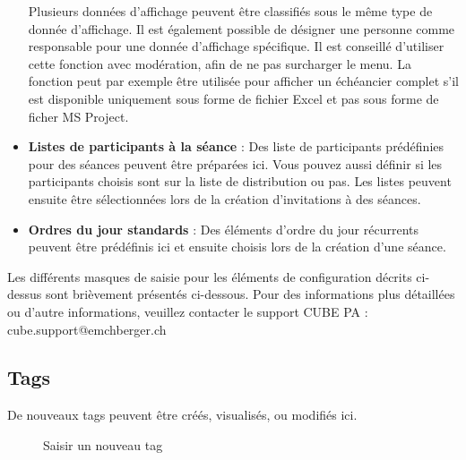\begin{itemize}
Plusieurs données d'affichage peuvent être classifiés sous le même type de donnée d'affichage. Il est également possible de désigner une personne comme responsable pour une donnée d'affichage spécifique. Il est conseillé d'utiliser cette fonction avec modération, afin de ne pas surcharger le menu. La fonction peut par exemple être utilisée pour afficher un échéancier complet s'il est disponible uniquement sous forme de fichier Excel et pas sous forme de ficher MS Project.
\item
\textbf{Listes de participants à la séance} : Des liste de participants prédéfinies pour des séances peuvent être préparées ici. Vous pouvez aussi définir si les participants choisis sont sur la liste de distribution ou pas. Les listes peuvent ensuite être sélectionnées lors de la création d'invitations à des séances.
\item
\textbf{Ordres du jour standards} : Des éléments d'ordre du jour récurrents peuvent être prédéfinis ici et ensuite choisis lors de la création d'une séance.
\end{itemize}

\vspace{\baselineskip}

Les différents masques de saisie pour les éléments de configuration décrits ci-dessus sont brièvement présentés ci-dessous. Pour des informations plus détaillées ou d'autre informations, veuillez contacter le support CUBE PA : {\color{red} cube.support@emchberger.ch}

\subsection{Tags}

De nouveaux tags peuvent être créés, visualisés, ou modifiés ici.

\begin{figure}[H]
\caption{Saisir un nouveau tag}
\end{figure}

